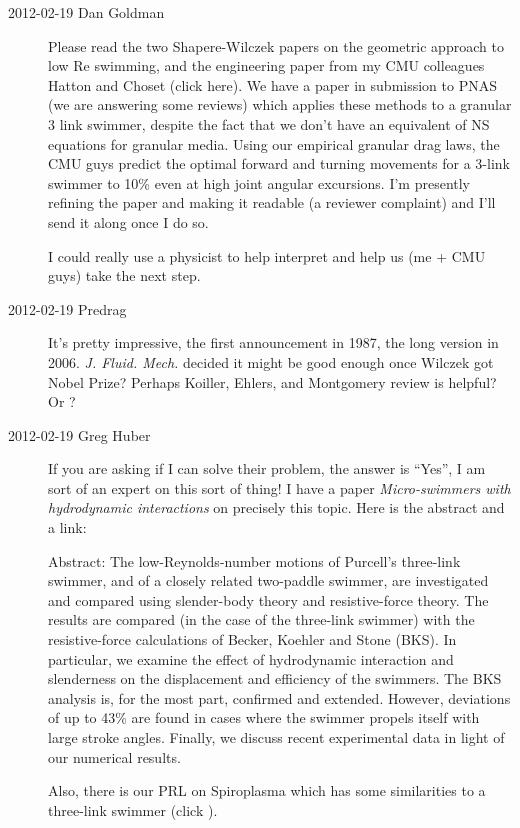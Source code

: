 \begin{description}

\item[2012-02-19 Dan Goldman]
Please read the two Shapere-Wilczek papers on the
geometric approach to low Re swimming, and the engineering paper from my
CMU colleagues Hatton and Choset (click
{here}). We have a paper in submission to PNAS (we are answering some
reviews) which applies these methods to a granular 3 link swimmer,
despite the fact that we don't have an equivalent of NS equations for
granular media. Using our empirical granular drag laws, the CMU guys
predict the optimal forward and turning movements for a 3-link swimmer to
10\% even at high joint angular excursions. I'm presently refining the
paper and making it readable (a reviewer complaint) and I'll send it
along once I do so.

I could really use a physicist to help interpret and help us (me + CMU
guys) take the next step.


\item[2012-02-19 Predrag] It's pretty impressive, the first
announcement in 1987, the long version in
2006. {\em J. Fluid. Mech.} decided it might be good enough once Wilczek
got Nobel Prize?
Perhaps Koiller, Ehlers, and Montgomery review is helpful?
Or ?

\item[2012-02-19 Greg Huber]
If you are asking if I can solve their problem, the answer is ``Yes'', I
am sort of an expert on this sort of thing! I have a paper
{\em Micro-swimmers with hydrodynamic interactions} on precisely this
topic. Here is the abstract and a
{link}:

Abstract:  The low-Reynolds-number motions of Purcell's three-link
swimmer, and of a closely related two-paddle swimmer, are investigated
and compared using slender-body theory and resistive-force theory. The
results are compared (in the case of the three-link swimmer) with the
resistive-force calculations of Becker, Koehler and Stone
(BKS). In particular, we examine the effect of hydrodynamic interaction
and slenderness on the displacement and efficiency of the swimmers. The
BKS analysis is, for the most part, confirmed and extended. However,
deviations of up to 43\% are found in cases where the swimmer propels
itself with large stroke angles. Finally, we discuss recent experimental
data in light of our numerical results.

Also, there is our PRL on Spiroplasma which has some
similarities to a three-link swimmer (click
).


\end{description}
